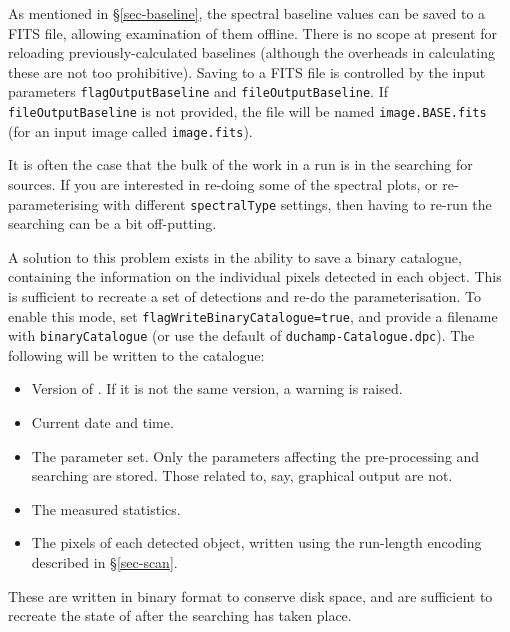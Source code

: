 \label{sec-baselineOut}

As mentioned in \S\ref{sec-baseline}, the spectral baseline values can
be saved to a FITS file, allowing examination of them offline. There
is no scope at present for reloading previously-calculated baselines
(although the overheads in calculating these are not too
prohibitive). Saving to a FITS file is controlled by the input
parameters \texttt{flagOutputBaseline} and
\texttt{fileOutputBaseline}. If \texttt{fileOutputBaseline} is not
provided, the file will be named \texttt{image.BASE.fits} (for an
input image called \texttt{image.fits}).



\label{sec-reuse}


\label{sec-bincat}

It is often the case that the bulk of the work in a \duchamp run is in
the searching for sources. If you are interested in re-doing some of
the spectral plots, or re-parameterising with different
\texttt{spectralType} settings, then having to re-run the searching
can be a bit off-putting. 

A solution to this problem exists in the ability to save a binary
catalogue, containing the information on the individual pixels
detected in each object. This is sufficient to recreate a set of
detections and re-do the parameterisation. To enable this mode, set
\texttt{flagWriteBinaryCatalogue=true}, and provide a filename with
\texttt{binaryCatalogue} (or use the default of
\texttt{duchamp-Catalogue.dpc}). The following will be written to the
catalogue: 
\begin{itemize}
\item Version of \duchamp. If it is not the same version, a warning is raised.
\item Current date and time.
\item The parameter set. Only the parameters affecting the
  pre-processing and searching are stored. Those related to, say,
  graphical output are not.
\item The measured statistics.
\item The pixels of each detected object, written using the run-length
  encoding described in \S\ref{sec-scan}.
\end{itemize}
These are written in binary format to conserve disk space, and are
sufficient to recreate the state of \duchamp after the searching has
taken place. 

